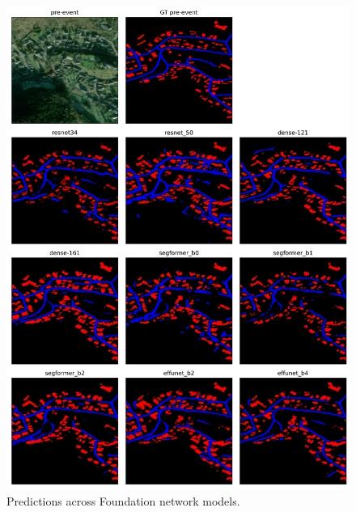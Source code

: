 \documentclass[10pt,twocolumn,letterpaper]{article}
\begin{document}
\clearpage
\begin{figure}[t]
  \centering
   \includegraphics[width=2\linewidth]{final-report/figures/sample_images_foundation_1.png}
   \caption{Predictions across Foundation network models.}
   \label{fig:sample_images_foundation_1}
\end{figure}
\end{document}

